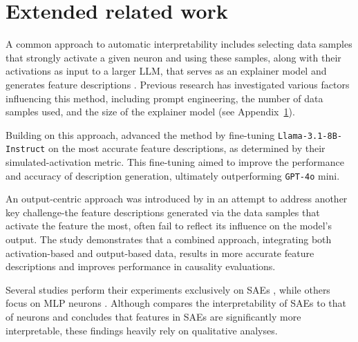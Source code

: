 \label{sec:appendix}
\section{Extended related work}
\label{appendix-related-work}

A common approach to automatic interpretability includes selecting data samples that strongly activate a given neuron and using these samples, along with their activations as input to a larger LLM, that serves as an explainer model and generates feature descriptions \cite{bills2023language, bricken2023monosemanticity, choi2024automatic, paulo2024automaticallyinterpretingmillionsfeatures, rajamanoharan2024jumpingaheadimprovingreconstruction}. Previous research has investigated various factors influencing this method, including prompt engineering, the number of data samples used, and the size of the explainer model (see Appendix~\ref{appendix-related-work}).

Building on this approach, \cite{choi2024automatic} advanced the method by fine-tuning \texttt{Llama-3.1-8B-Instruct} on the most accurate feature descriptions, as determined by their  simulated-activation metric. This fine-tuning aimed to improve the performance and accuracy of description generation, ultimately outperforming \texttt{GPT-4o} mini.

An output-centric approach was introduced by
\cite{gurarieh2025enhancingautomatedinterpretabilityoutputcentric} in an  attempt to address another key challenge-the feature descriptions generated via the data samples that activate the feature the most, often fail to reflect its influence on the model’s output. The study demonstrates that a combined approach, integrating both activation-based and output-based data, results in more accurate feature descriptions and improves performance in causality evaluations.

Several studies perform their experiments exclusively on SAEs \cite{goodfire, paulo2024automaticallyinterpretingmillionsfeatures, rajamanoharan2024jumpingaheadimprovingreconstruction,templeton2024scaling}, while others focus on MLP neurons \cite{bills2023language, choi2024automatic}. Although \cite{templeton2024scaling} compares the interpretability of SAEs to that of neurons and concludes that features in SAEs are significantly more interpretable, these findings heavily rely on qualitative analyses. 

